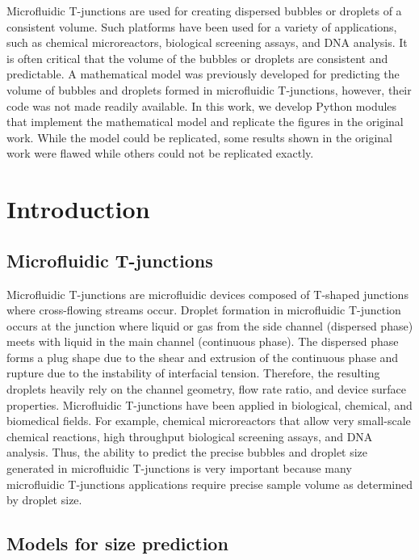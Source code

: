 Microfluidic T-junctions are used for creating dispersed bubbles or droplets
of a consistent volume. Such platforms have been used for a variety of applications,
such as chemical microreactors, biological screening assays, and DNA analysis.
It is often critical that the volume of the
bubbles or droplets are consistent and predictable. A mathematical model was
previously developed for predicting the volume of bubbles and droplets formed in
microfluidic T-junctions, however, their code was not made readily available.
In this work, we develop Python modules that implement the mathematical model and 
replicate the figures in the original work. While the model
could be replicated, some results shown in the original work were flawed while others
could not be replicated exactly.

\section{Introduction}

\subsection{Microfluidic T-junctions}

Microfluidic T-junctions are microfluidic devices composed of T-shaped junctions
where cross-flowing streams occur. Droplet formation in microfluidic T-junction
occurs at the junction where liquid or gas from the side channel (dispersed phase)
meets with liquid in the main channel (continuous phase). The dispersed phase forms
a plug shape due to the shear and extrusion of the continuous phase and rupture due
to the instability of interfacial tension\supercite{huang_precise_2020}. Therefore, the
resulting droplets heavily rely on the channel geometry, flow rate ratio, and device
surface properties\supercite{dreyfus_ordered_2003}. Microfluidic T-junctions have been
applied in biological, chemical, and biomedical
fields\supercite{casadevall_i_solvas_droplet_2011}.
For example, chemical microreactors that allow very small-scale chemical reactions, high
throughput biological screening assays, and DNA analysis\supercite{ibrahim_modeling_2021}.
Thus, the ability to predict the precise bubbles and droplet size generated in microfluidic
T-junctions is very important because many microfluidic T-junctions applications require
precise sample volume as determined by droplet size.

\subsection{Models for size prediction}

